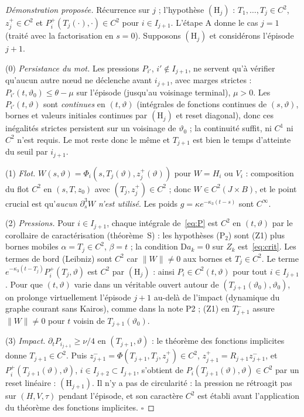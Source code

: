 \documentclass[11pt,a4paper]{article}
\theoremstyle{remark}
\newcommand{\vth}{\vartheta}
\newcommand{\D}{\mathrm D}
\begin{document}
\begin{proof}[Démonstration proposée]
Récurrence sur $j$ ; l'hypothèse $(\mathrm H_j)$ : $T_1,\dots,T_j\in C^2$, $z_j^+\in C^2$ et $P_i^+(T_j(\cdot),\cdot)\in C^2$ pour $i\in I_{j+1}$. L'étape A donne le cas $j=1$ (traité avec la factorisation en $s=0$). Supposons $(\mathrm H_{j})$ et considérons l'épisode $j+1$.

(0) \emph{Persistance du mot.} Les pressions $P_{i'}$, $i'\notin I_{j+1}$, ne servent qu'à vérifier qu'aucun autre nœud ne déclenche avant $i_{j+1}$, avec marges strictes : $P_{i'}(t,\vth_0)\le\theta-\mu$ sur l'épisode (jusqu'au voisinage terminal), $\mu>0$. Les $P_{i'}(t,\vth)$ sont \emph{continues} en $(t,\vth)$ (intégrales de fonctions continues de $(s,\vth)$, bornes et valeurs initiales continues par $(\mathrm H_j)$ et reset diagonal), donc ces inégalités strictes persistent sur un voisinage de $\vth_0$ ; la continuité suffit, ni $C^1$ ni $C^2$ n'est requis. Le mot reste donc le même et $T_{j+1}$ est bien le temps d'atteinte du seuil par $i_{j+1}$.

(1) \emph{Flot.} $W(s,\vth)=\Phi_{i}(s,T_j(\vth),z_j^+(\vth))$ pour $W=H_i$ ou $V_i$ : composition du flot $C^2$ en $(s,T,z_0)$ avec $(T_j,z_j^+)\in C^2$ ; donc $W\in C^2(J\times B)$, et le point crucial est qu'\emph{aucun $\partial_s^3W$ n'est utilisé}. Les poids $g=\kappa e^{-\kappa_3(t-s)}$ sont $C^\infty$.

(2) \emph{Pressions.} Pour $i\in I_{j+1}$, chaque intégrale de~\eqref{eq:P} est $C^2$ en $(t,\vth)$ par le corollaire de caractérisation (théorème~S) : les hypothèses (P$_2$) sont (Z1) plus bornes mobiles $\alpha=T_j\in C^2$, $\beta=t$ ; la condition $\D a_k=0$ sur $Z_k$ est~\eqref{eq:crit}. Les termes de bord (Leibniz) sont $C^2$ car $\lVert W\rVert\ne0$ aux bornes et $T_j\in C^2$. Le terme $e^{-\kappa_3(t-T_j)}P_i^+(T_j,\vth)$ est $C^2$ par $(\mathrm H_j)$ : ainsi $P_i\in C^2(t,\vth)$ pour tout $i\in I_{j+1}$. Pour que $(t,\vth)$ varie dans un véritable ouvert autour de $(T_{j+1}(\vth_0),\vth_0)$, on prolonge virtuellement l'épisode $j+1$ au-delà de l'impact (dynamique du graphe courant sans Kairos), comme dans la note P2 ; (Z1) en $T_{j+1}^-$ assure $\lVert W\rVert\ne0$ pour $t$ voisin de $T_{j+1}(\vth_0)$.

(3) \emph{Impact.} $\partial_tP_{i_{j+1}}\ge\nu/4$ en $(T_{j+1},\vth)$ : le théorème des fonctions implicites donne $T_{j+1}\in C^2$. Puis $z_{j+1}^-=\Phi(T_{j+1},T_j,z_j^+)\in C^2$, $z_{j+1}^+=R_{j+1}z_{j+1}^-$, et $P^+_i(T_{j+1}(\vth),\vth)$, $i\in I_{j+2}\subset I_{j+1}$, s'obtient de $P_i(T_{j+1}(\vth),\vth)\in C^2$ par un reset linéaire : $(\mathrm H_{j+1})$. Il n'y a pas de circularité : la pression ne rétroagit pas sur $(H,V,\tau)$ pendant l'épisode, et son caractère $C^2$ est établi avant l'application du théorème des fonctions implicites. $\square$
\end{proof}
\end{document}
